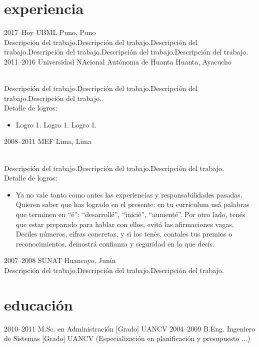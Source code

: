 \documentclass[]{cv-style}
\begin{document}
\section{experiencia}
\begin{entrylist}
\entry
  {2017--Hoy}
  {UBML}
  {Puno, Puno}
  {\\
Descripción del trabajo.Descripción del trabajo.Descripción del trabajo.Descripción del trabajo.Descripción del trabajo.Descripción del trabajo.}
\entry
  {2011--2016}
  {Universidad NAcional Autónoma de Huanta}
  {Huanta, Ayacucho}
  {\\
  Descripción del trabajo.Descripción del trabajo.Descripción del trabajo.Descripción del trabajo.. \\
  Detalle de logros:
  \begin{itemize}
    \item Logro 1. Logro 1. Logro 1.
  \end{itemize}}
\entry
  {2008--2011}
  {MEF}
  {Lima, Lima}
  {\\
Descripción del trabajo.Descripción del trabajo.Descripción del trabajo.\\
  Detalle de logros:
  \begin{itemize}
    \item Ya no vale tanto como antes las experiencias y responsabilidades pasadas. Quieren saber que has logrado en el presente: en tu curriculum usá palabras que terminen en “é”: “desarrollé”, “inicié”, “aumenté”. Por otro lado, tenés que estar preparado para hablar con ellos, evitá las afirmaciones vagas. Deciles números, cifras concretas, y si los tenés, contales tus premios o reconocimientos, demostrá confianza y seguridad en lo que decís.
  \end{itemize}}
\entry
  {2007--2008}
  {SUNAT}
  {Huancayo, Junín}
  {\\
Descripción del trabajo.Descripción del trabajo.Descripción del trabajo.\\}
\end{entrylist}

\section{educación}
\begin{entrylist}
\entry
{2010--2011}
{M.Sc. {\normalfont en Administración [Grado]}}
{UANCV}
{\vspace{-0.3cm}}
\entry
{2004--2009}
{B.Eng. {\normalfont Ingeniero de Sistemas [Grado]}}
{UANCV}
{(Especialización en planificación y presupuesto ...)}
\end{entrylist}
\end{document}
